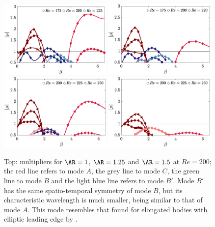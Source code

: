 \begin{figure}
  \centering
  \includegraphics[width=0.49\textwidth]{./fig/AR1/neutralb.eps}
  \includegraphics[width=0.49\textwidth]{./fig/AR1p25/neutralb.eps}  
  \includegraphics[width=0.49\textwidth]{./fig/AR1p5/neutralb.eps}    
  \includegraphics[width=0.49\textwidth]{./fig/AR1p75/neutralb.eps}       
  \caption{Top: multipliers for $\AR=1$, $\AR=1.25$ and $\AR=1.5$ at $Re=200$; the red line refers to mode $A$, the grey line to mode $C$, the green line to mode $B$ and the light blue line refers to mode $B'$. Mode $B'$ has the same spatio-temporal symmetry of mode $B$, but its characteristic wavelength is much smaller, being similar to that of mode $A$. This mode resembles that found for elongated bodies with elliptic leading edge by \cite{ryan-etal-2005}.}
  \label{fig:mult_AR1_AR1p75}
\end{figure}
